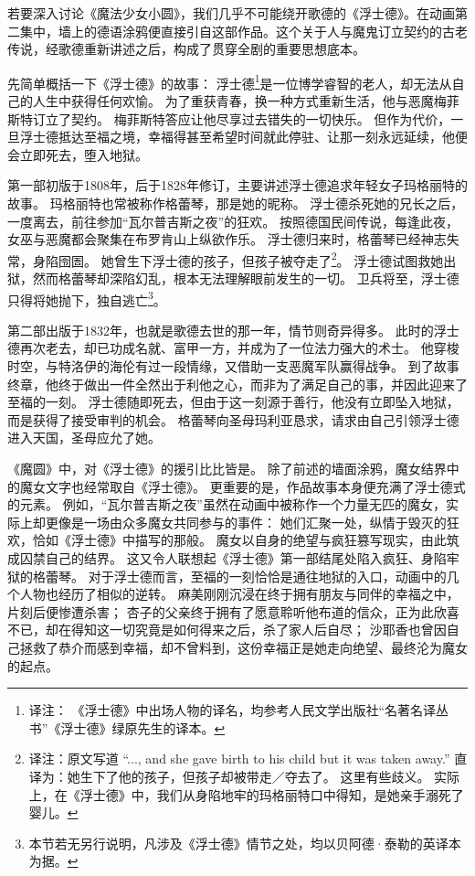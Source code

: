 若要深入讨论《魔法少女小圆》，我们几乎不可能绕开歌德的《浮士德》。在动画第二集中，墙上的德语涂鸦便直接引自这部作品。这个关于人与魔鬼订立契约的古老传说，经歌德重新讲述之后，构成了贯穿全剧的重要思想底本。

先简单概括一下《浮士德》的故事：
浮士德\footnote{%
    译注：
    《浮士德》中出场人物的译名，均参考人民文学出版社“名著名译丛书”《浮士德》绿原先生的译本。
}是一位博学睿智的老人，却无法从自己的人生中获得任何欢愉。
为了重获青春，换一种方式重新生活，他与恶魔梅菲斯特订立了契约。
梅菲斯特答应让他尽享过去错失的一切快乐。
但作为代价，一旦浮士德抵达至福之境，幸福得甚至希望时间就此停驻、让那一刻永远延续，他便会立即死去，堕入地狱。

第一部初版于1808年，后于1828年修订，主要讲述浮士德追求年轻女子玛格丽特的故事。
玛格丽特也常被称作格蕾琴，那是她的昵称。
浮士德杀死她的兄长之后，一度离去，前往参加“瓦尔普吉斯之夜”的狂欢。
按照德国民间传说，每逢此夜，女巫与恶魔都会聚集在布罗肯山上纵欲作乐。
浮士德归来时，格蕾琴已经神志失常，身陷囹圄。
她曾生下浮士德的孩子，但孩子被夺走了\footnote{%
   译注：原文写道 ``..., and she gave birth to his child but it was taken away.''
   直译为：她生下了他的孩子，但孩子却被带走／夺去了。
   这里有些歧义。
   实际上，在《浮士德》中，我们从身陷地牢的玛格丽特口中得知，是她亲手溺死了婴儿。
}。
浮士德试图救她出狱，然而格蕾琴却深陷幻乱，根本无法理解眼前发生的一切。
卫兵将至，浮士德只得将她抛下，独自逃亡\footnote{%
    本节若无另行说明，凡涉及《浮士德》情节之处，均以贝阿德·泰勒的英译本为据\cite{goethe2005faust}。
}。


第二部出版于1832年，也就是歌德去世的那一年，情节则奇异得多。
此时的浮士德再次老去，却已功成名就、富甲一方，并成为了一位法力强大的术士。
他穿梭时空，与特洛伊的海伦有过一段情缘，又借助一支恶魔军队赢得战争。
到了故事终章，他终于做出一件全然出于利他之心，而非为了满足自己的事，并因此迎来了至福的一刻。
浮士德随即死去，但由于这一刻源于善行，他没有立即坠入地狱，而是获得了接受审判的机会。
格蕾琴向圣母玛利亚恳求，请求由自己引领浮士德进入天国，圣母应允了她\cite{thomas2004introduction-faust}。


《魔圆》中，对《浮士德》的援引比比皆是。
除了前述的墙面涂鸦，魔女结界中的魔女文字也经常取自《浮士德》。
更重要的是，作品故事本身便充满了浮士德式的元素。
例如，“瓦尔普吉斯之夜”虽然在动画中被称作一个力量无匹的魔女，实际上却更像是一场由众多魔女共同参与的事件：
她们汇聚一处，纵情于毁灭的狂欢，恰如《浮士德》中描写的那般。
魔女以自身的绝望与疯狂篡写现实，由此筑成囚禁自己的结界。
这又令人联想起《浮士德》第一部结尾处陷入疯狂、身陷牢狱的格蕾琴。
对于浮士德而言，至福的一刻恰恰是通往地狱的入口，动画中的几个人物也经历了相似的逆转。
麻美刚刚沉浸在终于拥有朋友与同伴的幸福之中，片刻后便惨遭杀害；
杏子的父亲终于拥有了愿意聆听他布道的信众，正为此欣喜不已，却在得知这一切究竟是如何得来之后，杀了家人后自尽；
沙耶香也曾因自己拯救了恭介而感到幸福，却不曾料到，这份幸福正是她走向绝望、最终沦为魔女的起点。


